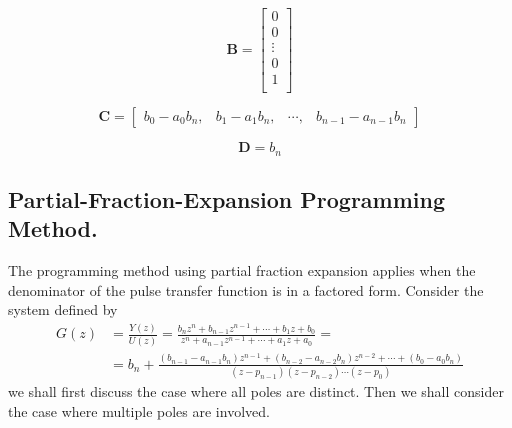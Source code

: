 \documentclass[12pt,a4paper,oneside]{book}
\begin{document}
\begin{onehalfspace}
\begin{mybox}
\begin{equation}\label{ccanonical_form_eq2}
	\mathbf{B} = \left[ \begin{matrix}
		0  \\
		0  \\
		\vdots \\
		0  \\
		1  \\
	\end{matrix}\right] 
\end{equation}

\begin{equation}\label{ccanonical_form_eq3}
	\mathbf{C} = \left[ \begin{matrix}
		b_0-a_0b_n, & b_1-a_1b_n, & \cdots, & b_{n-1}-a_{n-1}b_n
	\end{matrix}\right] 
\end{equation}

\begin{equation}\label{ccanonical_form_eq4}
	\mathbf{D} = b_n 
\end{equation}
\end{mybox}


\subsection{Partial-Fraction-Expansion Programming Method.} The programming 
method using partial fraction expansion applies when the denominator of the 
pulse transfer function is in a factored form.
Consider the system defined by
\begin{equation}\label{pfepm_eq_1}
	\begin{aligned}
		G(z)&=\frac{Y(z)}{U(z)} = \frac{b_nz^n+b_{n-1}z^{n-1}+ \cdots +b_1z+b_0}{z^n+a_{n-1}z^{n-1}+ \cdots +a_1z+a_0} = \\[6pt]
		&= b_n+\frac{(b_{n-1}-a_{n-1}b_n)z^{n-1}+(b_{n-2}-a_{n-2}b_n)z^{n-2}+\cdots+(b_0-a_0b_n)}{(z-p_{n-1})(z-p_{n-2})\cdots(z-p_{0})}
	\end{aligned}
\end{equation}
we shall first discuss the case where all poles are distinct. Then we shall consider the case where multiple poles are involved.


\end{onehalfspace}
\end{document}
